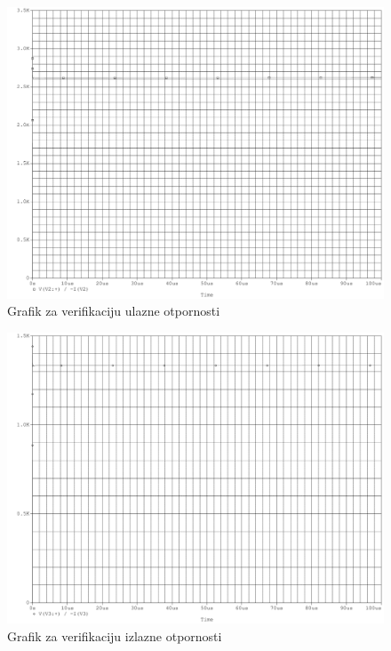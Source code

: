 \documentclass{article}
\begin{document}
            \begin{figure}[H]
                \centering
                \includegraphics[width=\textwidth,height=\textheight,keepaspectratio]{Ulazna.pdf}
                \caption{Grafik za verifikaciju ulazne otpornosti}
                \label{Ulazna}
            \end{figure}
            \begin{figure}[H]
                \centering
                \includegraphics[width=\textwidth,height=\textheight,keepaspectratio]{Izlazna.pdf}
                \caption{Grafik za verifikaciju izlazne otpornosti}
                \label{Izlazna}
            \end{figure}
\end{document}
